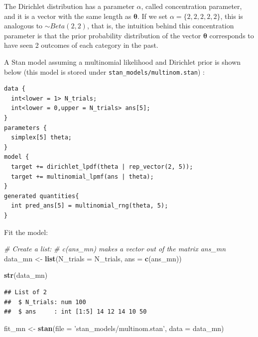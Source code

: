 \documentclass[12pt,]{krantz}
\newenvironment{Shaded}{\begin{snugshade}}{\end{snugshade}}
\newcommand{\CommentTok}[1]{\textcolor[rgb]{0.56,0.35,0.01}{\textit{#1}}}
\newcommand{\DataTypeTok}[1]{\textcolor[rgb]{0.13,0.29,0.53}{#1}}
\newcommand{\KeywordTok}[1]{\textcolor[rgb]{0.13,0.29,0.53}{\textbf{#1}}}
\newcommand{\NormalTok}[1]{#1}
\newcommand{\StringTok}[1]{\textcolor[rgb]{0.31,0.60,0.02}{#1}}
\theoremstyle{definition}
\theoremstyle{definition}
\theoremstyle{definition}
\theoremstyle{remark}
\begin{document}
The Dirichlet distribution has a parameter \(\alpha\), called concentration parameter, and it is a vector with the same length as \(\boldsymbol{\theta}\). If we set \(\alpha = \{2,2,2,2,2\}\), this is analogous to \(\sim Beta(2,2)\), that is, the intuition behind this concentration parameter is that the prior probability distribution of the vector \(\boldsymbol{\theta}\) corresponds to have seen 2 outcomes of each category in the past.

A Stan model assuming a multinomial likelihood and Dirichlet prior is shown below (this model is stored under \texttt{stan\_models/multinom.stan}) :

\begin{verbatim}
data {
  int<lower = 1> N_trials;
  int<lower = 0,upper = N_trials> ans[5];
}
parameters {
  simplex[5] theta;
}
model {
  target += dirichlet_lpdf(theta | rep_vector(2, 5));
  target += multinomial_lpmf(ans | theta);
}
generated quantities{
  int pred_ans[5] = multinomial_rng(theta, 5);
}
\end{verbatim}

Fit the model:

\begin{Shaded}
\begin{Highlighting}[]
\CommentTok{# Create a list:}
\CommentTok{# c(ans_mn) makes a vector out of the matrix ans_mn}
\NormalTok{data_mn <-}\StringTok{  }\KeywordTok{list}\NormalTok{(}\DataTypeTok{N_trials =}\NormalTok{ N_trials,}
                 \DataTypeTok{ans =} \KeywordTok{c}\NormalTok{(ans_mn)) }
\end{Highlighting}
\end{Shaded}

\begin{Shaded}
\begin{Highlighting}[]
\KeywordTok{str}\NormalTok{(data_mn)}
\end{Highlighting}
\end{Shaded}

\begin{verbatim}
## List of 2
##  $ N_trials: num 100
##  $ ans     : int [1:5] 14 12 14 10 50
\end{verbatim}

\begin{Shaded}
\begin{Highlighting}[]
\NormalTok{fit_mn <-}\StringTok{ }\KeywordTok{stan}\NormalTok{(}\DataTypeTok{file =} \StringTok{'stan_models/multinom.stan'}\NormalTok{, }
               \DataTypeTok{data =}\NormalTok{ data_mn)}
\end{Highlighting}
\end{Shaded}
\end{document}

